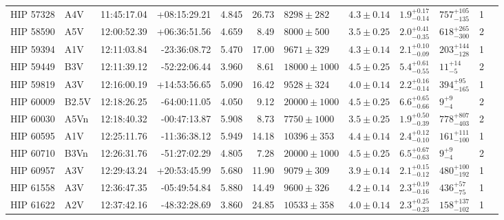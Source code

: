 \begin{tiny}
\begin{longtable}{|l|lrrrrllllll|}
   HIP 57328 &      A4V &    11:45:17.04 &   +08:15:29.21 &   4.845 &     26.73 &    $8298 \pm 282$ &  $4.3 \pm 0.14$ &  $1.9^{+0.17}_{-0.14}$ &   $757^{+105}_{-135}$ &       1 \\
   HIP 58590 &      A5V &    12:00:52.39 &   +06:36:51.56 &   4.659 &      8.49 &    $8000 \pm 500$ &  $3.5 \pm 0.25$ &  $2.0^{+0.41}_{-0.35}$ &   $618^{+265}_{-300}$ &       2 \\
   HIP 59394 &      A1V &    12:11:03.84 &   -23:36:08.72 &   5.470 &     17.00 &    $9671 \pm 329$ &  $4.3 \pm 0.14$ &  $2.1^{+0.10}_{-0.09}$ &   $203^{+144}_{-128}$ &       1 \\
   HIP 59449 &      B3V &    12:11:39.12 &   -52:22:06.44 &   3.960 &      8.61 &  $18000 \pm 1000$ &  $4.5 \pm 0.25$ &  $5.4^{+0.61}_{-0.55}$ &       $11^{+14}_{-5}$ &       2 \\
   HIP 59819 &      A3V &    12:16:00.19 &   +14:53:56.65 &   5.090 &     16.42 &    $9528 \pm 324$ &  $4.0 \pm 0.14$ &  $2.2^{+0.16}_{-0.14}$ &    $394^{+95}_{-165}$ &       1 \\
   HIP 60009 &    B2.5V &    12:18:26.25 &   -64:00:11.05 &   4.050 &      9.12 &  $20000 \pm 1000$ &  $4.5 \pm 0.25$ &  $6.6^{+0.65}_{-0.66}$ &         $9^{+9}_{-4}$ &       2 \\
   HIP 60030 &     A5Vn &    12:18:40.32 &   -00:47:13.87 &   5.908 &      8.73 &   $7750 \pm 1000$ &  $3.5 \pm 0.25$ &  $1.9^{+0.50}_{-0.39}$ &   $778^{+807}_{-403}$ &       2 \\
   HIP 60595 &      A1V &    12:25:11.76 &   -11:36:38.12 &   5.949 &     14.18 &   $10396 \pm 353$ &  $4.4 \pm 0.14$ &  $2.4^{+0.12}_{-0.10}$ &   $161^{+111}_{-100}$ &       1 \\
   HIP 60710 &     B3Vn &    12:26:31.76 &   -51:27:02.29 &   4.805 &      7.28 &  $20000 \pm 1000$ &  $4.5 \pm 0.25$ &  $6.5^{+0.67}_{-0.63}$ &         $9^{+9}_{-4}$ &       2 \\
   HIP 60957 &      A3V &    12:29:43.24 &   +20:53:45.99 &   5.680 &     11.90 &    $9079 \pm 309$ &  $3.9 \pm 0.14$ &  $2.1^{+0.15}_{-0.12}$ &   $480^{+100}_{-192}$ &       1 \\
   HIP 61558 &      A3V &    12:36:47.35 &   -05:49:54.84 &   5.880 &     14.49 &    $9600 \pm 326$ &  $4.2 \pm 0.14$ &  $2.3^{+0.19}_{-0.16}$ &     $436^{+57}_{-75}$ &       1 \\
   HIP 61622 &      A2V &    12:37:42.16 &   -48:32:28.69 &   3.860 &     24.85 &   $10533 \pm 358$ &  $4.0 \pm 0.14$ &  $2.3^{+0.25}_{-0.23}$ &   $158^{+137}_{-102}$ &       1 \\

\end{longtable}
\end{tiny}
